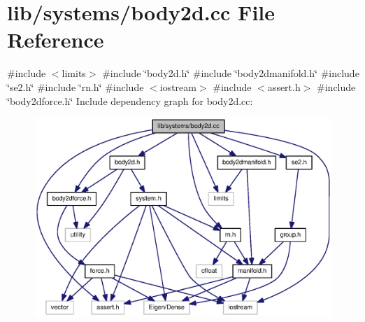 \section{lib/systems/body2d.cc \-File \-Reference}
\label{body2d_8cc}
{\ttfamily \#include $<$limits$>$}\*
{\ttfamily \#include \char`\"{}body2d.\-h\char`\"{}}\*
{\ttfamily \#include \char`\"{}body2dmanifold.\-h\char`\"{}}\*
{\ttfamily \#include \char`\"{}se2.\-h\char`\"{}}\*
{\ttfamily \#include \char`\"{}rn.\-h\char`\"{}}\*
{\ttfamily \#include $<$iostream$>$}\*
{\ttfamily \#include $<$assert.\-h$>$}\*
{\ttfamily \#include \char`\"{}body2dforce.\-h\char`\"{}}\*
\-Include dependency graph for body2d.\-cc\-:\nopagebreak
\begin{figure}[H]
\begin{center}
\leavevmode
\includegraphics[width=350pt]{body2d_8cc__incl}
\end{center}
\end{figure}
